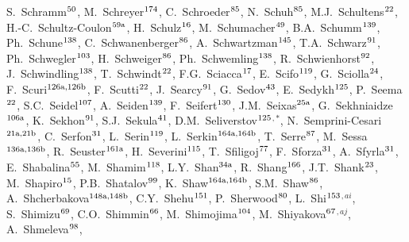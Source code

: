 \begin{flushleft}
S.~Schramm$^\textrm{\scriptsize 50}$,
M.~Schreyer$^\textrm{\scriptsize 174}$,
C.~Schroeder$^\textrm{\scriptsize 85}$,
N.~Schuh$^\textrm{\scriptsize 85}$,
M.J.~Schultens$^\textrm{\scriptsize 22}$,
H.-C.~Schultz-Coulon$^\textrm{\scriptsize 59a}$,
H.~Schulz$^\textrm{\scriptsize 16}$,
M.~Schumacher$^\textrm{\scriptsize 49}$,
B.A.~Schumm$^\textrm{\scriptsize 139}$,
Ph.~Schune$^\textrm{\scriptsize 138}$,
C.~Schwanenberger$^\textrm{\scriptsize 86}$,
A.~Schwartzman$^\textrm{\scriptsize 145}$,
T.A.~Schwarz$^\textrm{\scriptsize 91}$,
Ph.~Schwegler$^\textrm{\scriptsize 103}$,
H.~Schweiger$^\textrm{\scriptsize 86}$,
Ph.~Schwemling$^\textrm{\scriptsize 138}$,
R.~Schwienhorst$^\textrm{\scriptsize 92}$,
J.~Schwindling$^\textrm{\scriptsize 138}$,
T.~Schwindt$^\textrm{\scriptsize 22}$,
F.G.~Sciacca$^\textrm{\scriptsize 17}$,
E.~Scifo$^\textrm{\scriptsize 119}$,
G.~Sciolla$^\textrm{\scriptsize 24}$,
F.~Scuri$^\textrm{\scriptsize 126a,126b}$,
F.~Scutti$^\textrm{\scriptsize 22}$,
J.~Searcy$^\textrm{\scriptsize 91}$,
G.~Sedov$^\textrm{\scriptsize 43}$,
E.~Sedykh$^\textrm{\scriptsize 125}$,
P.~Seema$^\textrm{\scriptsize 22}$,
S.C.~Seidel$^\textrm{\scriptsize 107}$,
A.~Seiden$^\textrm{\scriptsize 139}$,
F.~Seifert$^\textrm{\scriptsize 130}$,
J.M.~Seixas$^\textrm{\scriptsize 25a}$,
G.~Sekhniaidze$^\textrm{\scriptsize 106a}$,
K.~Sekhon$^\textrm{\scriptsize 91}$,
S.J.~Sekula$^\textrm{\scriptsize 41}$,
D.M.~Seliverstov$^\textrm{\scriptsize 125}$$^{,*}$,
N.~Semprini-Cesari$^\textrm{\scriptsize 21a,21b}$,
C.~Serfon$^\textrm{\scriptsize 31}$,
L.~Serin$^\textrm{\scriptsize 119}$,
L.~Serkin$^\textrm{\scriptsize 164a,164b}$,
T.~Serre$^\textrm{\scriptsize 87}$,
M.~Sessa$^\textrm{\scriptsize 136a,136b}$,
R.~Seuster$^\textrm{\scriptsize 161a}$,
H.~Severini$^\textrm{\scriptsize 115}$,
T.~Sfiligoj$^\textrm{\scriptsize 77}$,
F.~Sforza$^\textrm{\scriptsize 31}$,
A.~Sfyrla$^\textrm{\scriptsize 31}$,
E.~Shabalina$^\textrm{\scriptsize 55}$,
M.~Shamim$^\textrm{\scriptsize 118}$,
L.Y.~Shan$^\textrm{\scriptsize 34a}$,
R.~Shang$^\textrm{\scriptsize 166}$,
J.T.~Shank$^\textrm{\scriptsize 23}$,
M.~Shapiro$^\textrm{\scriptsize 15}$,
P.B.~Shatalov$^\textrm{\scriptsize 99}$,
K.~Shaw$^\textrm{\scriptsize 164a,164b}$,
S.M.~Shaw$^\textrm{\scriptsize 86}$,
A.~Shcherbakova$^\textrm{\scriptsize 148a,148b}$,
C.Y.~Shehu$^\textrm{\scriptsize 151}$,
P.~Sherwood$^\textrm{\scriptsize 80}$,
L.~Shi$^\textrm{\scriptsize 153}$$^{,ai}$,
S.~Shimizu$^\textrm{\scriptsize 69}$,
C.O.~Shimmin$^\textrm{\scriptsize 66}$,
M.~Shimojima$^\textrm{\scriptsize 104}$,
M.~Shiyakova$^\textrm{\scriptsize 67}$$^{,aj}$,
A.~Shmeleva$^\textrm{\scriptsize 98}$,
$$
\end{flushleft}
